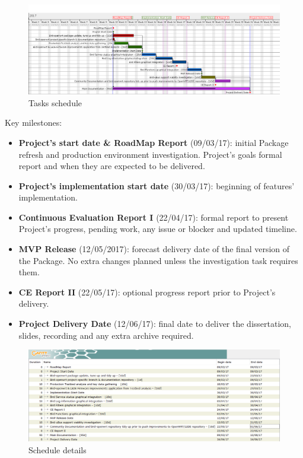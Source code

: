 \begin{landscape}

\begin{figure}[h!]
\centering
    \includegraphics[width=\hsize]{images/gantt}
    \caption{Tasks schedule}
    \label{fig:general_gantt}
\end{figure}

Key milestones:
\begin{itemize}
    \item \textbf{Project's start date \& RoadMap Report} (09/03/17): initial Package refresh and production environment investigation. Project's goals formal report and when they are expected to be delivered.
    \item \textbf{Project's implementation start date} (30/03/17): beginning of features' implementation.
    \item \textbf{Continuous Evaluation Report I} (22/04/17): formal report to present Project's progress, pending work, any issue or blocker and updated  timeline.
    \item \textbf{MVP Release} (12/05/2017): forecast delivery date of the final version of the Package. No extra changes planned unless the investigation task requires them.
    \item \textbf{CE Report II} (22/05/17): optional progress report prior to Project's delivery.
    \item \textbf{Project Delivery Date} (12/06/17): final date to deliver the dissertation, slides, recording and any extra archive required.
\end{itemize} 

\begin{figure}[h!]
    \includegraphics[width=\hsize]{images/gantt_data}
    \caption{Schedule details}
    \label{fig:detail_gantt}
\end{figure}
\end{landscape}


